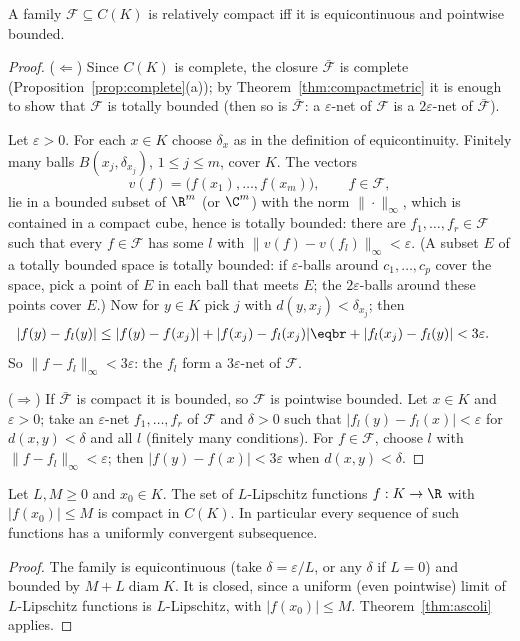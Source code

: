 \begin{theorem}\label{thm:ascoli}
A family $\mathcal F\subseteq C(K)$ is relatively compact iff it is equicontinuous and pointwise bounded.
\end{theorem}
\begin{proof}
($\Leftarrow$) Since $C(K)$ is complete, the closure $\bar{\mathcal F}$ is complete (Proposition~\ref{prop:complete}(a)); by Theorem~\ref{thm:compactmetric} it is enough to show that
$\mathcal F$ is totally bounded (then so is $\bar{\mathcal F}$: a $\varepsilon$-net of $\mathcal F$ is a $2\varepsilon$-net of $\bar{\mathcal F}$).

Let $\varepsilon>0$. For each $x\in K$ choose $\delta_x$ as in the definition of equicontinuity. Finitely many balls $B(x_j,\delta_{x_j})$, $1\le j\le m$, cover $K$. The vectors
\[v(f)=\bigl(f(x_1),\dots,f(x_m)\bigr),\qquad f\in\mathcal F,\]
lie in a bounded subset of $\R^m$ (or $\C^m$) with the norm $\|\cdot\|_\infty$, which is contained in a compact cube, hence is totally bounded: there are
$f_1,\dots,f_r\in\mathcal F$ such that every $f\in\mathcal F$ has some $l$ with $\|v(f)-v(f_l)\|_\infty<\varepsilon$. (A subset $E$ of a totally bounded space is totally bounded: if
$\varepsilon$-balls around $c_1,\dots,c_p$ cover the space, pick a point of $E$ in each ball that meets $E$; the $2\varepsilon$-balls around these points cover $E$.) Now for $y\in K$ pick $j$
with $d(y,x_j)<\delta_{x_j}$; then
\[\begin{aligned}|f(y)-f_l(y)|&\le|f(y)-f(x_j)|+|f(x_j)-f_l(x_j)|\eqbr+|f_l(x_j)-f_l(y)|<3\varepsilon.\end{aligned}\]
So $\|f-f_l\|_\infty<3\varepsilon$: the $f_l$ form a $3\varepsilon$-net of $\mathcal F$.

($\Rightarrow$) If $\bar{\mathcal F}$ is compact it is bounded, so $\mathcal F$ is pointwise bounded. Let $x\in K$ and $\varepsilon>0$; take an $\varepsilon$-net $f_1,\dots,f_r$ of $\mathcal F$ and $\delta>0$ such
that $|f_l(y)-f_l(x)|<\varepsilon$ for $d(x,y)<\delta$ and all $l$ (finitely many conditions). For $f\in\mathcal F$, choose $l$ with $\|f-f_l\|_\infty<\varepsilon$; then $|f(y)-f(x)|<3\varepsilon$ when
$d(x,y)<\delta$.
\end{proof}

\begin{corollary}\label{cor:lipcompact}
Let $L,M\ge0$ and $x_0\in K$. The set of $L$-Lipschitz functions $f:K\to\R$ with $|f(x_0)|\le M$ is compact in $C(K)$. In particular every sequence of such
functions has a uniformly convergent subsequence.
\end{corollary}
\begin{proof}
The family is equicontinuous (take $\delta=\varepsilon/L$, or any $\delta$ if $L=0$) and bounded by $M+L\operatorname{diam}K$. It is closed, since a uniform (even pointwise) limit of $L$-Lipschitz
functions is $L$-Lipschitz, with $|f(x_0)|\le M$. Theorem~\ref{thm:ascoli} applies.
\end{proof}

